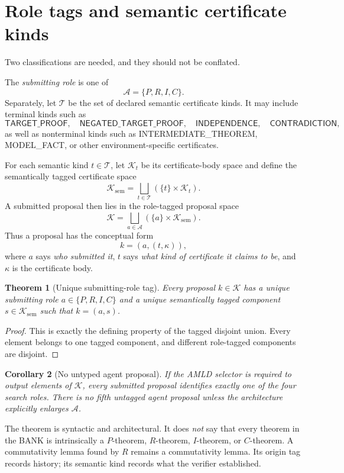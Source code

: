 \documentclass[11pt,openany]{book}
\newtheorem{theorem}{Theorem}[chapter]
\newtheorem{corollary}[theorem]{Corollary}
\theoremstyle{definition}
\theoremstyle{remark}
\newcommand{\Cert}{\mathcal{K}}
\newcommand{\Agents}{\mathcal{A}}
\begin{document}
\section{Role tags and semantic certificate kinds}
Two classifications are needed, and they should not be conflated.

The \emph{submitting role} is one of
\[
\Agents=\{P,R,I,C\}.
\]
Separately, let $\mathcal T$ be the set of declared semantic certificate kinds. It may include terminal kinds such as
\[
\mathsf{TARGET\_PROOF},\quad
\mathsf{NEGATED\_TARGET\_PROOF},\quad
\mathsf{INDEPENDENCE},\quad
\mathsf{CONTRADICTION},
\]
as well as nonterminal kinds such as \textsf{INTERMEDIATE\_THEOREM}, \textsf{MODEL\_FACT}, or other environment-specific certificates.

For each semantic kind $t\in\mathcal T$, let $\Cert_t$ be its certificate-body space and define the semantically tagged certificate space
\[
\Cert_{\mathrm{sem}}
=\bigsqcup_{t\in\mathcal T}(\{t\}\times\Cert_t).
\]
A submitted proposal then lies in the role-tagged proposal space
\[
\Cert
=\bigsqcup_{a\in\Agents}(\{a\}\times\Cert_{\mathrm{sem}}).
\]
Thus a proposal has the conceptual form
\[
k=(a,(t,\kappa)),
\]
where $a$ says \emph{who submitted it}, $t$ says \emph{what kind of certificate it claims to be}, and $\kappa$ is the certificate body.

\begin{theorem}[Unique submitting-role tag]\label{thm:uniquerole}
Every proposal $k\in\Cert$ has a unique submitting role $a\in\{P,R,I,C\}$ and a unique semantically tagged component $s\in\Cert_{\mathrm{sem}}$ such that $k=(a,s)$.
\end{theorem}
\begin{proof}
This is exactly the defining property of the tagged disjoint union. Every element belongs to one tagged component, and different role-tagged components are disjoint.
\end{proof}

\begin{corollary}[No untyped agent proposal]\label{cor:nountyped}
If the AMLD selector is required to output elements of $\Cert$, every submitted proposal identifies exactly one of the four search roles. There is no fifth untagged agent proposal unless the architecture explicitly enlarges $\Agents$.
\end{corollary}

The theorem is syntactic and architectural. It does \emph{not} say that every theorem in the BANK is intrinsically a $P$-theorem, $R$-theorem, $I$-theorem, or $C$-theorem. A commutativity lemma found by $R$ remains a commutativity lemma. Its origin tag records history; its semantic kind records what the verifier established.
\end{document}
